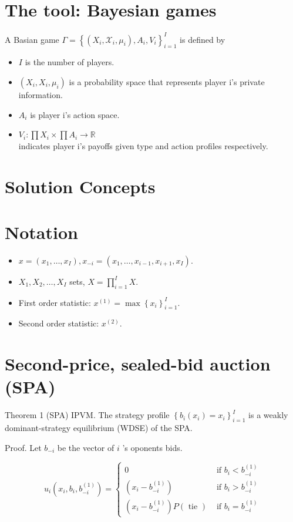 \documentclass[10pt]{article}
\begin{document}
\section*{The tool: Bayesian games}
A Basian game $\Gamma=\left\{\left(X_{i}, \mathcal{X}_{i}, \mu_{i}\right), A_{i}, V_{i}\right\}_{i=1}^{I}$ is defined by

\begin{itemize}
  \item $I$ is the number of players.
  \item $\left(X_{i}, X_{i}, \mu_{i}\right)$ is a probability space that represents player i's private information.
  \item $A_{i}$ is player i's action space.
  \item $V_{i}: \prod X_{i} \times \prod A_{i} \rightarrow \mathbb{R}$\\
indicates player i's payoffs given type and action profiles respectively.
\end{itemize}

\section*{Solution Concepts}
\section*{Notation}
\begin{itemize}
  \item $x=\left(x_{1}, \ldots, x_{I}\right), x_{-i}=\left(x_{1}, \ldots, x_{i-1}, x_{i+1}, x_{I}\right)$.
  \item $X_{1}, X_{2}, \ldots, X_{I}$ sets, $X=\prod_{i=1}^{I} X$.
  \item First order statistic: $x^{(1)}=\max \left\{x_{i}\right\}_{i=1}^{I}$.
  \item Second order statistic: $x^{(2)}$.
\end{itemize}

\section*{Second-price, sealed-bid auction (SPA)}
Theorem 1 (SPA) IPVM. The strategy profile $\left\{b_{i}\left(x_{i}\right)=x_{i}\right\}_{i=1}^{I}$ is a weakly dominant-strategy equilibrium (WDSE) of the SPA.

Proof. Let $b_{-i}$ be the vector of $i$ 's oponents bids.

$$
u_{i}\left(x_{i}, b_{i}, b_{-i}^{(1)}\right)= \begin{cases}0 & \text { if } b_{i}<b_{-i}^{(1)} \\ \left(x_{i}-b_{-i}^{(1)}\right) & \text { if } b_{i}>b_{-i}^{(1)} \\ \left(x_{i}-b_{-i}^{(1)}\right) P(\text { tie }) & \text { if } b_{i}=b_{-i}^{(1)}\end{cases}
$$
\end{document}

